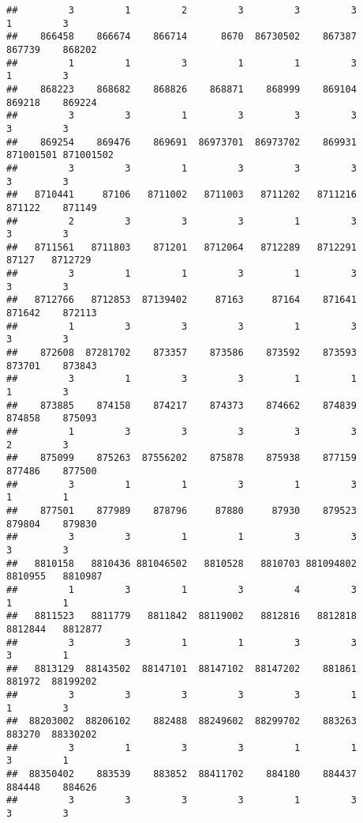 \documentclass[
]{article}
\begin{document}
\begin{verbatim}
##         3         1         2         3         3         3         1         3 
##    866458    866674    866714      8670  86730502    867387    867739    868202 
##         1         1         3         1         1         3         1         3 
##    868223    868682    868826    868871    868999    869104    869218    869224 
##         3         3         1         3         3         3         3         3 
##    869254    869476    869691  86973701  86973702    869931 871001501 871001502 
##         3         3         1         3         3         3         3         3 
##   8710441     87106   8711002   8711003   8711202   8711216    871122    871149 
##         2         3         3         3         1         3         3         3 
##   8711561   8711803    871201   8712064   8712289   8712291     87127   8712729 
##         3         1         1         3         1         3         3         3 
##   8712766   8712853  87139402     87163     87164    871641    871642    872113 
##         1         3         3         3         1         3         3         3 
##    872608  87281702    873357    873586    873592    873593    873701    873843 
##         3         1         3         3         1         1         1         3 
##    873885    874158    874217    874373    874662    874839    874858    875093 
##         1         3         3         3         3         3         2         3 
##    875099    875263  87556202    875878    875938    877159    877486    877500 
##         3         1         1         3         1         3         1         1 
##    877501    877989    878796     87880     87930    879523    879804    879830 
##         3         3         1         1         3         3         3         3 
##   8810158   8810436 881046502   8810528   8810703 881094802   8810955   8810987 
##         1         3         1         3         4         3         1         1 
##   8811523   8811779   8811842  88119002   8812816   8812818   8812844   8812877 
##         3         3         1         1         3         3         3         1 
##   8813129  88143502  88147101  88147102  88147202    881861    881972  88199202 
##         3         3         3         3         3         1         1         3 
##  88203002  88206102    882488  88249602  88299702    883263    883270  88330202 
##         3         1         3         3         1         1         3         1 
##  88350402    883539    883852  88411702    884180    884437    884448    884626 
##         3         3         3         3         1         3         3         3 

\end{verbatim}
\end{document}
